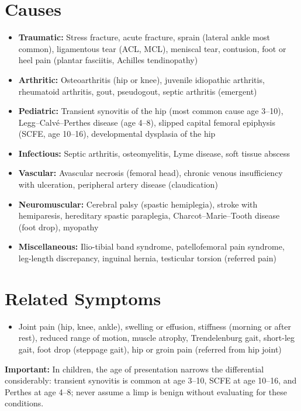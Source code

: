 \section*{Causes}
\begin{itemize}
  \item \textbf{Traumatic:} Stress fracture, acute fracture, sprain (lateral ankle most common), ligamentous tear (ACL, MCL), meniscal tear, contusion, foot or heel pain (plantar fasciitis, Achilles tendinopathy)
  \item \textbf{Arthritic:} Osteoarthritis (hip or knee), juvenile idiopathic arthritis, rheumatoid arthritis, gout, pseudogout, septic arthritis (emergent)
  \item \textbf{Pediatric:} Transient synovitis of the hip (most common cause age 3--10), Legg--Calv\'{e}--Perthes disease (age 4--8), slipped capital femoral epiphysis (SCFE, age 10--16), developmental dysplasia of the hip
  \item \textbf{Infectious:} Septic arthritis, osteomyelitis, Lyme disease, soft tissue abscess
  \item \textbf{Vascular:} Avascular necrosis (femoral head), chronic venous insufficiency with ulceration, peripheral artery disease (claudication)
  \item \textbf{Neuromuscular:} Cerebral palsy (spastic hemiplegia), stroke with hemiparesis, hereditary spastic paraplegia, Charcot--Marie--Tooth disease (foot drop), myopathy
  \item \textbf{Miscellaneous:} Ilio-tibial band syndrome, patellofemoral pain syndrome, leg-length discrepancy, inguinal hernia, testicular torsion (referred pain)
\end{itemize}

\section*{Related Symptoms}
\begin{itemize}
  \item Joint pain (hip, knee, ankle), swelling or effusion, stiffness (morning or after rest), reduced range of motion, muscle atrophy, Trendelenburg gait, short-leg gait, foot drop (steppage gait), hip or groin pain (referred from hip joint)
\end{itemize}
\textbf{Important:} In children, the age of presentation narrows the differential considerably: transient synovitis is common at age 3--10, SCFE at age 10--16, and Perthes at age 4--8; never assume a limp is benign without evaluating for these conditions.

